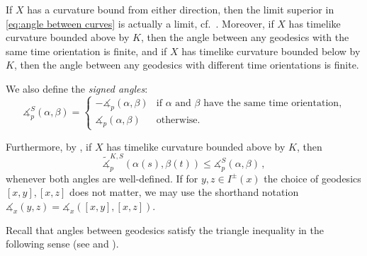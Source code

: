 \documentclass[11pt,reqno]{amsart}
\theoremstyle{definition}
\theoremstyle{definition}
\theoremstyle{plain}
\theoremstyle{remark}
\newcommand{\ma}{\measuredangle}
\begin{document}
If $X$ has a curvature bound from either direction, then the limit superior in \eqref{eq:angle between curves} is actually a limit, cf.\ \cite[Lemma~4.10 and Theorem~4.13]{beran-saemann2023}. 
Moreover, if $X$ has timelike curvature bounded above by $K$, then the angle between any geodesics with the same time orientation is finite, and if $X$ has timelike curvature bounded below by $K$, then the angle between any geodesics with different time orientations is finite. 


We also define the \textit{signed angles}: 
\begin{equation}\label{eq:signed angle}
\ma_p^S(\alpha,\beta) = \begin{cases}
-\ma_p(\alpha,\beta) & \text{if $\alpha$ and $\beta$ have the same time orientation,} \\
\ma_p(\alpha,\beta) & \text{otherwise}.
\end{cases}
\end{equation}

Furthermore, by \cite[Corollary~4.11]{beran-saemann2023}, if $X$ has timelike curvature bounded above by $K$, then
\begin{equation}\label{eq:angle condition}
\widetilde{\ma}_p^{K,S}(\alpha(s),\beta(t)) \leq \ma_p^S(\alpha,\beta)\, ,
\end{equation}
whenever both angles are well-defined. 
If for $y,z \in I^{\pm}(x)$ the choice of geodesics $[x,y],[x,z]$ does not matter, we may use the shorthand notation $\ma_x(y,z)=\ma_x([x,y],[x,z])$. 

Recall that angles between geodesics satisfy the triangle inequality in the following sense (see \cite[Theorems~3.1 and 4.5]{beran-saemann2023} and \cite[Lemma~4.14]{beran-kunzinger-rott2024}).
\end{document}
